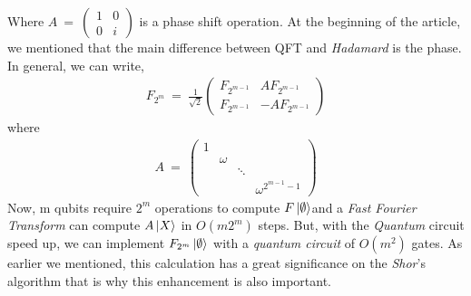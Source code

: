 \documentclass[a4paper,10pt]{article}
\begin{document}
Where $A\ =\ 
\begin{pmatrix}
 1 & 0 \\
 0 & i
\end{pmatrix}
$ is a phase shift operation. At the beginning of the article, we mentioned that the main difference between QFT and \textit{Hadamard} is the phase. 
In general, we can write,
\begin{eqnarray*}
F_{2^m}\ =\ \frac{1}{\sqrt{2}}
\begin{pmatrix}
 F_{2^{m-1}} & AF_{2^{m-1}} \\
 F_{2^{m-1}} & -AF_{2^{m-1}}
\end{pmatrix}
\end{eqnarray*}
where
\begin{eqnarray*}
A\ =\ 
\begin{pmatrix}
 1 & & & \\
   & \omega & & \\
   & & \ddots & \\
   & & & \omega^{2^{m-1}-1}
\end{pmatrix}
\end{eqnarray*}
Now, m qubits require $2^m$ operations to compute $F\ket{\emptyset}$and a \textit{Fast Fourier Transform} can compute $A\ket{X}$ in $O(m2^m)$ steps.
But, with the \textit{Quantum} circuit speed up, we can implement $F_{2^m}\ket{\emptyset}$ with a \textit{quantum circuit} of $O(m^2)$ gates. As earlier we mentioned, 
this calculation has a great significance on the \textit{Shor}'s algorithm that is why this enhancement is also important.


\end{document}
